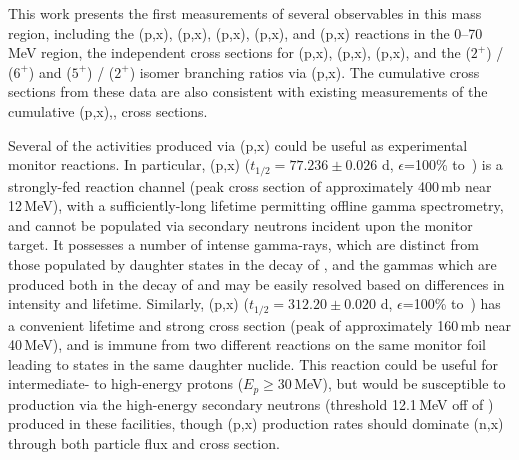 This work presents the first measurements of several observables in 
this mass region, including the (p,x), (p,x), (p,x),  (p,x), and (p,x) reactions in the 0--70\,MeV region, 
the independent cross sections for       (p,x), (p,x), (p,x), and the  ($2^+$) /   ($6^+$) and  ($5^+$) /   ($2^+$)  isomer branching ratios via (p,x).  
The cumulative cross sections from these data are also consistent with existing measurements of the cumulative (p,x),, cross sections.



Several of the activities produced via (p,x)  could be useful as experimental monitor reactions. 
In particular, (p,x) ($t_{1/2}=77.236\pm0.026$ d, $\epsilon$=100\% to \,\cite{Junde2011})  is a strongly-fed reaction channel (peak cross section of approximately 400\,mb near 12\,MeV), with a sufficiently-long lifetime permitting offline gamma spectrometry,  and  cannot be populated via secondary neutrons incident upon the monitor target. 
It possesses a number of intense gamma-rays, which are distinct from those populated by daughter states in the decay of  , and the gammas which are produced both in the decay of   and   may be easily resolved based on differences in intensity and lifetime. 
Similarly,  (p,x)  ($t_{1/2}=312.20\pm0.020$ d, $\epsilon$=100\% to \,\cite{Dong2014}) has a convenient lifetime and strong cross section (peak of approximately 160\,mb near 40\,MeV), and is immune from two different reactions on the same monitor foil leading to states in the same daughter nuclide.
This reaction could be useful for intermediate- to high-energy protons ($E_p \geq$30\,MeV), but would be susceptible to production via the high-energy secondary neutrons  (threshold 12.1\,MeV off of ) produced in these facilities, though (p,x) production rates should dominate (n,x) through both particle flux and cross section. 


